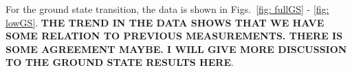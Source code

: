 For the ground state transition, the data is shown in Figs.~\ref{fig: fullGS} - \ref{fig: lowGS}. \textbf{THE TREND IN THE DATA SHOWS THAT WE HAVE SOME RELATION TO PREVIOUS MEASUREMENTS. THERE IS SOME AGREEMENT MAYBE. I WILL GIVE MORE DISCUSSION TO THE GROUND STATE RESULTS HERE}. 







